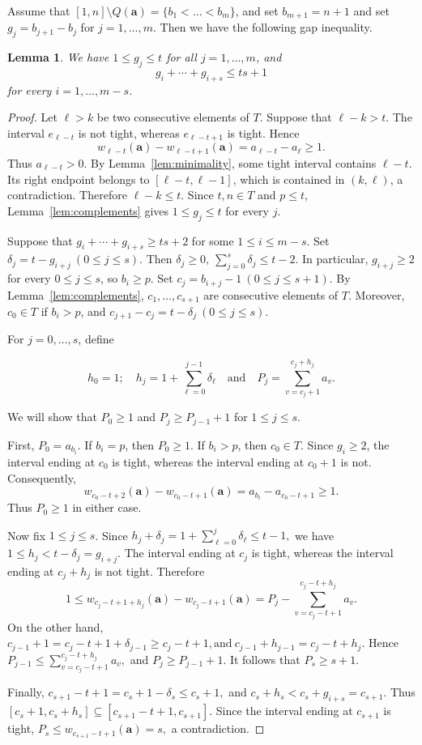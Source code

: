 \documentclass[12pt]{amsart}
\newtheorem{lemma}[theorem]{Lemma}
\theoremstyle{definition}
\theoremstyle{remark}
\numberwithin{equation}{section}
\begin{document}
Assume that $[1, n] \setminus Q(\mathbf{a}) = \{b_1 < \ldots < b_m\}$, and set $b_{m+1} = n+1$ and set $g_j = b_{j+1} - b_j$ for $j = 1, \ldots,m$. Then we have the following gap inequality.

\begin{lemma}\label{lem:gap-inequality}
We have $1 \le g_j \le t$ for all $j = 1, \ldots, m$, and
\[
g_{i} + \cdots + g_{i+s} \le ts + 1
\]
for every $i = 1, \ldots, m-s$.
\end{lemma}

\begin{proof}
Let $\ell>k$ be two consecutive elements of $T$.
Suppose that $\ell-k>t$. The interval $e_{\ell-t}$
is not tight, whereas $e_{\ell-t+1}$ is tight. Hence
\[
w_{\ell-t}(\mathbf a)-w_{\ell-t+1}(\mathbf a)
=a_{\ell-t}-a_\ell\ge1.
\]
Thus $a_{\ell-t}>0$. By Lemma~\ref{lem:minimality},
some tight interval contains $\ell-t$. Its right
endpoint belongs to $[\ell-t,\ell-1]$, which is
contained in $(k,\ell)$, a contradiction. Therefore
$\ell-k\le t$. Since $t,n\in T$ and $p\le t$,
Lemma~\ref{lem:complements} gives
$1\le g_j\le t$ for every $j$.

Suppose that
$
g_i+\cdots+g_{i+s}\ge ts+2
$
for some $1\le i\le m-s$. Set
$
\delta_j=t-g_{i+j}\ (0\le j\le s).
$
Then
$
\delta_j\ge0,\
\sum_{j=0}^{s}\delta_j\le t-2.
$
In particular, $g_{i+j}\ge2$ for every $0\le j\le s$,
so $b_i\ge p$. Set
$
c_j=b_{i+j}-1\ (0\le j\le s+1).
$
By Lemma~\ref{lem:complements},
$c_1,\ldots,c_{s+1}$ are consecutive elements of $T$.
Moreover, $c_0\in T$ if $b_i>p$, and
$
c_{j+1}-c_j=t-\delta_j\ (0\le j\le s).
$

For $j = 0, \ldots, s$, define

\[h_0 = 1; \quad  
h_j = 1 + \sum _{\ell=0}^{j-1} \delta_\ell \quad \text{and} \quad P_j = \sum_{v = c_j + 1}^{c_j + h_j} a_v.
\]

We will show that $P_0\ge1$ and
$P_j\ge P_{j-1}+1$ for $1\le j\le s$.

First, $P_0=a_{b_i}$. If $b_i=p$, then $P_0\ge1$.
If $b_i>p$, then $c_0\in T$. Since $g_i\ge2$,
the interval ending at $c_0$ is tight, whereas the
interval ending at $c_0+1$ is not. Consequently,
\[
w_{c_0-t+2}(\mathbf a)-w_{c_0-t+1}(\mathbf a)
=a_{b_i}-a_{c_0-t+1}\ge1.
\]
Thus $P_0\ge1$ in either case.

Now fix $1\le j\le s$. Since
$
h_j+\delta_j
=1+\sum_{\ell=0}^{j}\delta_\ell
\le t-1,
$
we have
$
1\le h_j<t-\delta_j=g_{i+j}.
$
The interval ending at $c_j$ is tight, whereas
the interval ending at $c_j+h_j$ is not tight.
Therefore
\[
1\le w_{c_j-t+1+h_j}(\mathbf a) -w_{c_j-t+1}(\mathbf a) =
P_j-\sum_{v=c_j-t+1}^{c_j-t+h_j}a_v.
\]
On the other hand,
$
c_{j-1}+1
=c_j-t+1+\delta_{j-1}
\ge c_j-t+1, \text{and} \
c_{j-1}+h_{j-1}
=c_j-t+h_j.
$
Hence
$
P_{j-1}\le
\sum_{v=c_j-t+1}^{c_j-t+h_j}a_v,
$
and $P_j\ge P_{j-1}+1$. It follows that $P_s\ge s+1$.

Finally,
$
c_{s+1}-t+1=c_s+1-\delta_s\le c_s+1,
$
and
$
c_s+h_s<c_s+g_{i+s}=c_{s+1}.
$
Thus
$
[c_s+1,c_s+h_s]
\subseteq[c_{s+1}-t+1,c_{s+1}].
$
Since the interval ending at $c_{s+1}$ is tight,
$
P_s\le w_{c_{s+1}-t+1}(\mathbf a)=s,
$
a contradiction.
\end{proof}
\end{document}

